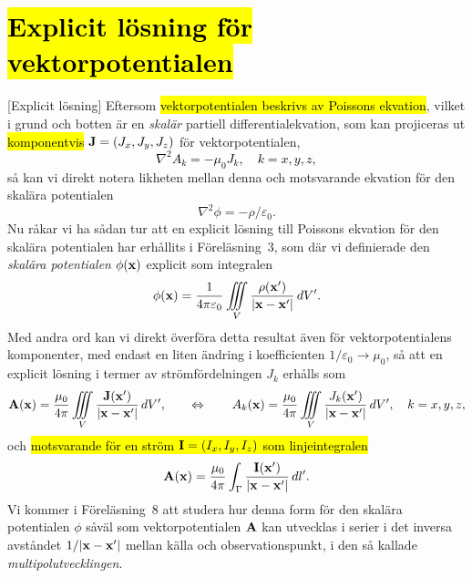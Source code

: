 {\section{{\hl{Explicit l{\"o}sning f{\"o}r vektorpotentialen}}}
[Explicit l{\"o}sning]
Eftersom {\hl{vektorpotentialen beskrivs av Poissons ekvation}}, vilket i grund
och botten {\"a}r en {\it skal{\"a}r} partiell differentialekvation, som kan
projiceras ut {\hl{komponentvis}} ${\bf J}=(J_x,J_y,J_z)$ f{\"o}r
vektorpotentialen,
\hl{$$
  \nabla^2 A_k=-\mu_0 J_k,\quad k=x,y,z,
$$}
s{\aa} kan vi direkt notera likheten mellan denna och motsvarande ekvation
f{\"o}r den skal{\"a}ra potentialen
$$
  \nabla^2\phi=-\rho/\varepsilon_0.
$$
Nu r{\aa}kar vi ha s{\aa}dan tur att en explicit l{\"o}sning till Poissons
ekvation f{\"o}r den skal{\"a}ra potentialen har erh{\aa}llits i
F{\"o}rel{\"a}sning~3, som
d{\"a}r vi definierade den {\it skal{\"a}ra potentialen} $\phi({\bf x})$
explicit som integralen
$$
  \phi({\bf x})={{1}\over{4\pi\varepsilon_0}}\iiint_V
    {{\rho({\bf x}')}\over{|{\bf x}-{\bf x}'|}}\,dV'.
$$
Med andra ord kan vi direkt {\"o}verf{\"o}ra detta resultat {\"a}ven f{\"o}r
vektorpotentialens komponenter, med endast en liten {\"a}ndring i koefficienten
$1/\varepsilon_0\to\mu_0$, s{\aa} att en explicit l{\"o}sning i termer av
str{\"o}mf{\"o}rdelningen $J_k$ erh{\aa}lls som
\hl{$$
  {\bf A}({\bf x})={{\mu_0}\over{4\pi}}\iiint_V
    {{{\bf J}({\bf x}')}\over{|{\bf x}-{\bf x}'|}}\,dV',
  \qquad\Leftrightarrow\qquad
  A_k({\bf x})={{\mu_0}\over{4\pi}}\iiint_V
    {{J_k({\bf x}')}\over{|{\bf x}-{\bf x}'|}}\,dV',\quad k=x,y,z,
$$}
och {\hl{motsvarande f{\"o}r en str{\"o}m ${\bf I}=(I_x,I_y,I_z)$ som
linjeintegralen}}
\hl{$$
  {\bf A}({\bf x})={{\mu_0}\over{4\pi}}\int_{\Gamma}
    {{{\bf I}({\bf x}')}\over{|{\bf x}-{\bf x}'|}}\,dl'.
$$}
Vi kommer i F{\"o}rel{\"a}sning~8 att studera hur denna form f{\"o}r den
skal{\"a}ra potentialen $\phi$ s{\aa}v{\"a}l som vektorpotentialen ${\bf A}$
kan utvecklas i serier i det inversa avst{\aa}ndet $1/|{\bf x}-{\bf x}'|$ mellan
k{\"a}lla och observationspunkt, i den s{\aa} kallade {\it multipolutvecklingen}.
\vfill\eject

}
